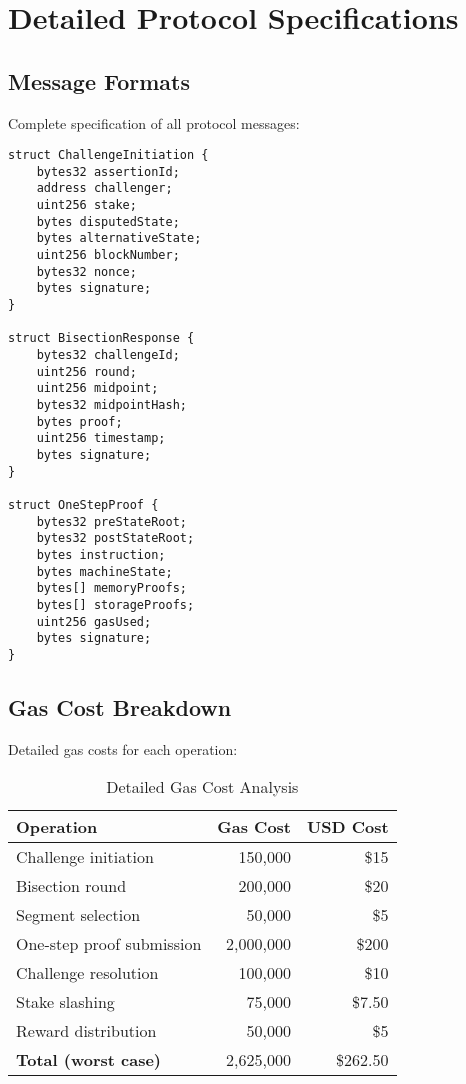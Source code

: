 \documentclass[11pt,a4paper]{article}
\theoremstyle{definition}
\begin{document}
\appendix

\section{Detailed Protocol Specifications}

\subsection{Message Formats}

Complete specification of all protocol messages:

\begin{lstlisting}[language=Solidity, caption=Protocol Message Structures]
struct ChallengeInitiation {
    bytes32 assertionId;
    address challenger;
    uint256 stake;
    bytes disputedState;
    bytes alternativeState;
    uint256 blockNumber;
    bytes32 nonce;
    bytes signature;
}

struct BisectionResponse {
    bytes32 challengeId;
    uint256 round;
    uint256 midpoint;
    bytes32 midpointHash;
    bytes proof;
    uint256 timestamp;
    bytes signature;
}

struct OneStepProof {
    bytes32 preStateRoot;
    bytes32 postStateRoot;
    bytes instruction;
    bytes machineState;
    bytes[] memoryProofs;
    bytes[] storageProofs;
    uint256 gasUsed;
    bytes signature;
}
\end{lstlisting}

\subsection{Gas Cost Breakdown}

Detailed gas costs for each operation:

\begin{table}[h]
\centering
\caption{Detailed Gas Cost Analysis}
\begin{tabular}{lrr}
\toprule
\textbf{Operation} & \textbf{Gas Cost} & \textbf{USD Cost} \\
\midrule
Challenge initiation & 150,000 & \$15 \\
Bisection round & 200,000 & \$20 \\
Segment selection & 50,000 & \$5 \\
One-step proof submission & 2,000,000 & \$200 \\
Challenge resolution & 100,000 & \$10 \\
Stake slashing & 75,000 & \$7.50 \\
Reward distribution & 50,000 & \$5 \\
\midrule
\textbf{Total (worst case)} & 2,625,000 & \$262.50 \\
\bottomrule
\end{tabular}
\end{table}
\end{document}
